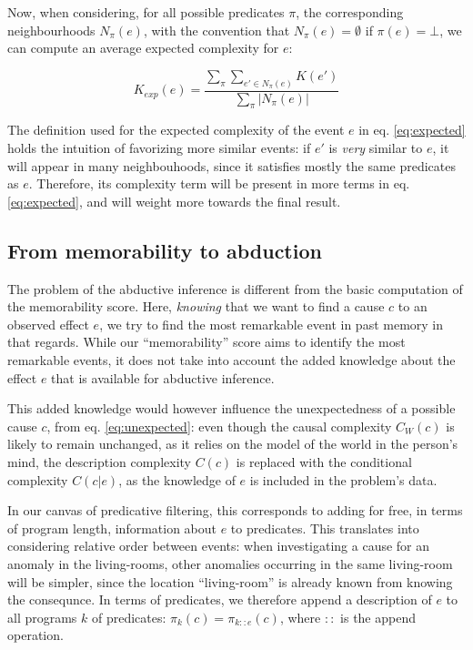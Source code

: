 \documentclass[conference]{IEEEtran}
\begin{document}
Now, when considering, for all possible predicates $\pi$, the corresponding
neighbourhoods $N_{\pi}(e)$, with the convention that $N_{\pi}(e) = \emptyset$
if $\pi(e) = \bot$, we can compute an average expected complexity for $e$:

\begin{equation}
\label{eq:expected}
K_{exp}(e) = \frac{
                    \sum_{\pi} \sum_{e' \in N_{\pi}(e)} K(e')
                  }{
                    \sum_{\pi} |N_{\pi}(e)|
                  }
\end{equation}

The definition used for the expected complexity of the event $e$ in eq.
\ref{eq:expected} holds the intuition of favorizing more similar events: if $e'$
is \emph{very} similar to $e$, it will appear in many neighbouhoods, since it
satisfies mostly the same predicates as $e$. Therefore, its complexity term will
be present in more terms in eq. \ref{eq:expected}, and will weight more towards
the final result.


\subsection{From memorability to abduction}
The problem of the abductive inference is different from the basic computation
of the memorability score. Here, \emph{knowing} that we want to find a cause $c$
to an observed effect $e$, we try to find the most remarkable event in past
memory in that regards. While our ``memorability'' score aims to identify the
most remarkable events, it does not take into account the added knowledge about
the effect $e$ that is available for abductive inference.

This added knowledge would however influence the unexpectedness of a possible
cause $c$, from eq. \ref{eq:unexpected}: even though the causal complexity
$C_{W}(c)$ is likely to remain unchanged, as it relies on the model of the world in
the person's mind, the description complexity $C(c)$ is replaced with the
conditional complexity $C(c|e)$, as the knowledge of $e$ is included in the
problem's data.

In our canvas of predicative filtering, this corresponds to adding for free, in
terms of program length, information about $e$ to predicates. This translates
into considering relative order between events: when investigating a cause for
an anomaly in the living-rooms, other anomalies occurring in the same
living-room will be simpler, since the location ``living-room'' is already known
from knowing the consequnce. In terms of predicates, we therefore append a
description of $e$ to all programs $k$ of predicates:
$\pi_{k}(c) = \pi_{k::e}(c)$, where $::$ is the append operation.
\end{document}
